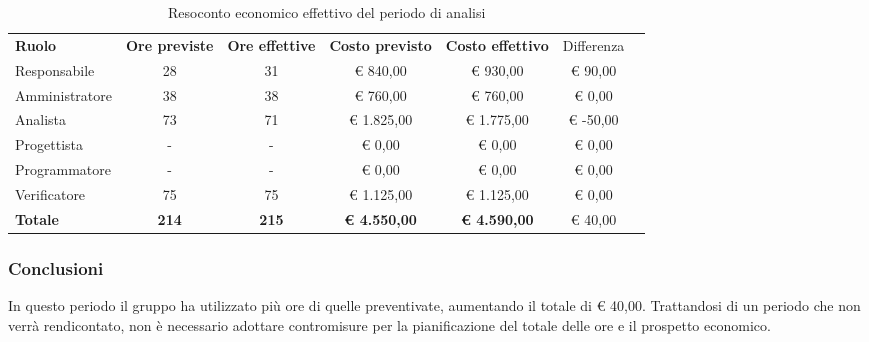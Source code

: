 \documentclass[../piano-di-progetto.tex]{subfiles}
\begin{document}
  \begin{table}[H]
    \centering
    \begin{tabular}{lcccccc}
      \rowcolor{lightgray}
      \textbf{Ruolo}  & \textbf{Ore previste} & \textbf{Ore effettive} & \textbf{Costo previsto} & \textbf{Costo effettivo} & Differenza \\
      Responsabile    & 28                    & 31                     & € 840,00                & € 930,00                 & € 90,00    \\
      Amministratore  & 38                    & 38                     & € 760,00                & € 760,00                 & € 0,00     \\
      Analista        & 73                    & 71                     & € 1.825,00              & € 1.775,00               & € -50,00   \\
      Progettista     & -                     & -                      & € 0,00                  & € 0,00                   & € 0,00     \\
      Programmatore   & -                     & -                      & € 0,00                  & € 0,00                   & € 0,00     \\
      Verificatore    & 75                    & 75                     & € 1.125,00              & € 1.125,00               & € 0,00     \\
      \textbf{Totale} & \textbf{214}          & \textbf{215}           & \textbf{€ 4.550,00}     & \textbf{€ 4.590,00}      & € 40,00   
      
    \end{tabular}
    \caption{Resoconto economico effettivo del periodo di analisi}
  \end{table}


\subsubsection{Conclusioni}
In questo periodo il gruppo ha utilizzato più ore di quelle preventivate, aumentando il totale di € 40,00. Trattandosi di un periodo che non verrà rendicontato, non è necessario adottare contromisure per la pianificazione del totale delle ore e il prospetto economico.
\end{document}
